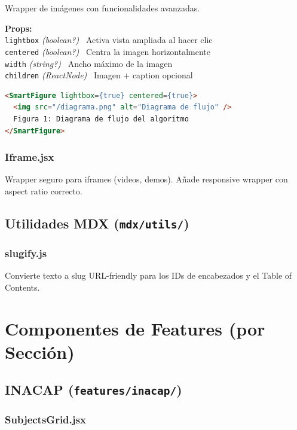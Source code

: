 \documentclass[12pt,a4paper]{article}
\newcommand{\prop}[3]{%
  \texttt{#1} \textit{(#2)} \textemdash\ #3\\%
}
\begin{document}
Wrapper de imágenes con funcionalidades avanzadas.

\begin{mdframed}[style=propbox]
\textbf{Props:}\\
\prop{lightbox}{boolean?}{Activa vista ampliada al hacer clic}
\prop{centered}{boolean?}{Centra la imagen horizontalmente}
\prop{width}{string?}{Ancho máximo de la imagen}
\prop{children}{ReactNode}{Imagen + caption opcional}
\end{mdframed}

\begin{lstlisting}[language=HTML]
<SmartFigure lightbox={true} centered={true}>
  <img src="/diagrama.png" alt="Diagrama de flujo" />
  Figura 1: Diagrama de flujo del algoritmo
</SmartFigure>
\end{lstlisting}

\subsubsection{Iframe.jsx}

Wrapper seguro para iframes (videos, demos). Añade responsive wrapper con aspect ratio correcto.

\subsection{Utilidades MDX (\texttt{mdx/utils/})}

\subsubsection{slugify.js}

Convierte texto a slug URL-friendly para los IDs de encabezados y el Table of Contents.

\section{Componentes de Features (por Sección)}

\subsection{INACAP (\texttt{features/inacap/})}

\subsubsection{SubjectsGrid.jsx}
\end{document}
